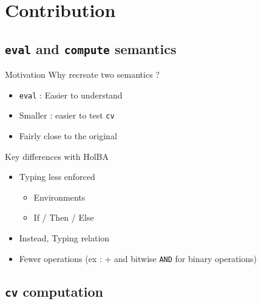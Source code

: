 \documentclass{beamer}
\begin{document}
\section{Contribution}
\subsection{\texttt{eval} and \texttt{compute} semantics}

\begin{frame}{Motivation}
  Why recreate two semantics ?
  \begin{itemize}
    \item<2-> \texttt{eval} : Easier to understand
    \item<2-> Smaller : easier to test \texttt{cv}
    \item<2-> Fairly close to the original
  \end{itemize}
\end{frame}

\begin{frame}{Key differences with HolBA}
  \begin{itemize}
    \item Typing less enforced
      \begin{itemize}
        \item Environments
        \item If / Then / Else
      \end{itemize}
    \item Instead, Typing relation
    \item Fewer operations (ex : + and bitwise \texttt{AND} for binary operations)
  \end{itemize}
\end{frame}



\subsection{\texttt{cv} computation}

\end{document}
